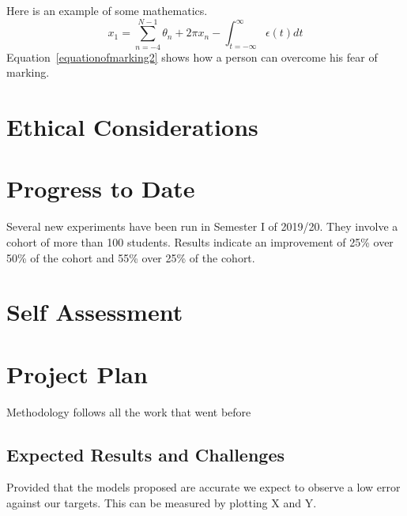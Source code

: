 \documentclass[11pt, a4paper]{article}
\begin{document}
Here is an example of some mathematics.
\begin{equation}
    x_1 = \sum_{n=-4}^{N-1} \theta_n + 2\pi x_n - \int_{t=-\infty}^{\infty} \epsilon(t) dt \label{equationofmarking2}
\end{equation}
Equation~\ref{equationofmarking2} shows how a person can overcome his fear of marking.

\section{Ethical Considerations}

\section{Progress to Date}
Several new experiments have been run in Semester I of 2019/20. They involve a cohort of more than 100 students. Results indicate an improvement of 25\% over 50\% of the cohort and 55\% over 25\% of the cohort. 

\section{Self Assessment}

\section{Project Plan}
Methodology follows all the work that went before \cite{dirac,boykov_2001}

\subsection{Expected Results and Challenges}
Provided that the models proposed are accurate we expect to observe a low error against our targets. This can be measured by plotting X and Y.



\end{document}
